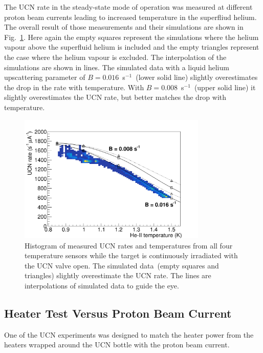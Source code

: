 The UCN rate in the steady-state mode of operation was measured at
different proton beam currents leading to increased temperature in the
superfliud helium. The overall result of those measurements and their
simulations are shown in Fig.~\ref{fig:rate_vs_temp_sim}. Here again
the empty squares represent the simulations where the helium vapour
above the superfluid helium is included and the empty triangles
represent the case where the helium vapour is excluded. The
interpolation of the simulations are shown in lines. The simulated
data with a liquid helium upscattering parameter of
$B= 0.016$~s$^{-1}$~(lower solid line) slightly overestimates the drop
in the rate with temperature. With $B= 0.008$~s$^{-1}$~(upper solid
line) it slightly overestimates the UCN rate, but better matches the
drop with temperature.


\begin{figure}[h!]
  \centering
  \includegraphics[width=0.8\textwidth]{rate_vs_Temp.pdf}
  \caption{Histogram of measured UCN rates and temperatures from all
    four temperature sensors while the target is continuously
    irradiated with the UCN valve open. The simulated data~(empty
    squares and triangles) slightly overestimate the UCN rate. The
    lines are interpolations of simulated data to guide the eye.}
  \label{fig:rate_vs_temp_sim}
\end{figure}



\subsection{Heater Test Versus Proton Beam Current}
One of the UCN experiments was designed to match the heater power from
the heaters wrapped around the UCN bottle with the proton beam
current.

